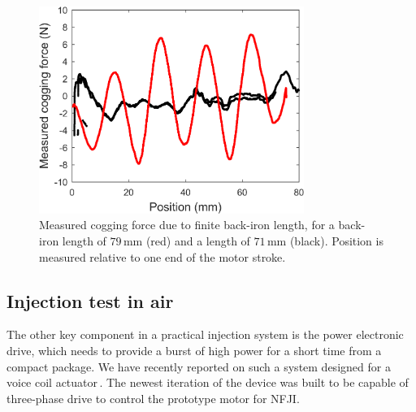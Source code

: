             
            \begin{figure}[h]
                \centering
                \includegraphics[width=3.4in]{chap5/images/cogging_measurement.png}
                \caption{Measured cogging force due to finite back-iron length, for a back-iron length of $79\,\mathrm{mm}$ (red) and a length of $71\,\mathrm{mm}$ (black). Position is measured relative to one end of the motor stroke.}
                \label{fig:chap/experiment/validation/cogging_force/cogging_measurement}
            \end{figure}
        
        
        \subsection{Injection test in air}              \label{Chapter:experiment/validation/injection test}
        
        
            The other key component in a practical injection system is the power electronic drive, which needs to provide a burst of high power for a short time from a compact package. We have recently reported on such a system designed for a voice coil actuator\,\cite{Ruddy2017}. The newest iteration of the device was built to be capable of three-phase drive to control the prototype motor for NFJI.


